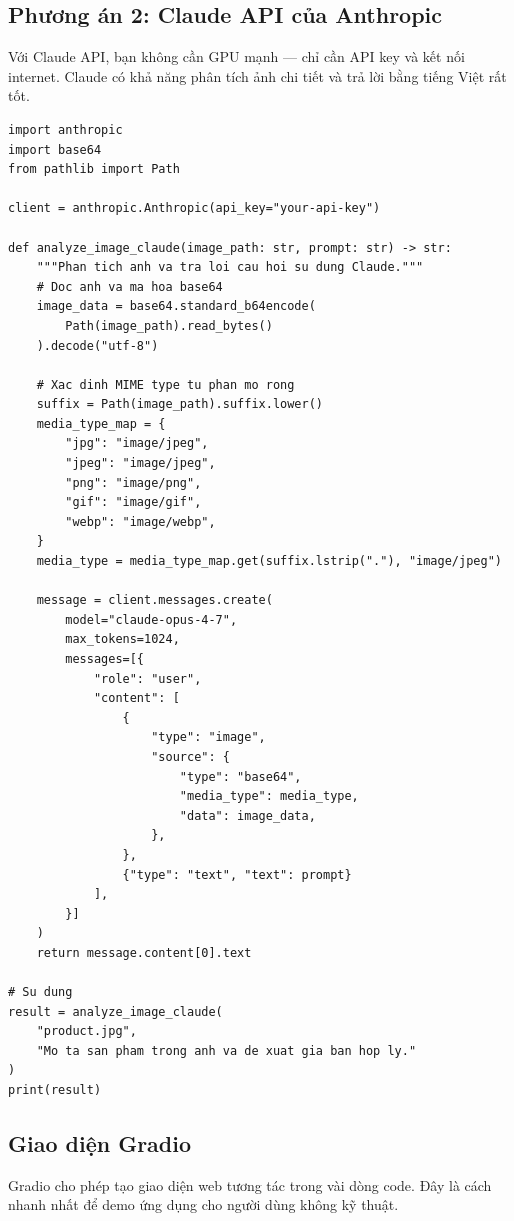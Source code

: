 \subsection{Phương án 2: Claude API của Anthropic}
\label{subsec:vchat_claude}

Với Claude API, bạn không cần GPU mạnh --- chỉ cần API key và kết nối internet. Claude có khả năng phân tích ảnh chi tiết và trả lời bằng tiếng Việt rất tốt.

\begin{verbatim}
import anthropic
import base64
from pathlib import Path

client = anthropic.Anthropic(api_key="your-api-key")

def analyze_image_claude(image_path: str, prompt: str) -> str:
    """Phan tich anh va tra loi cau hoi su dung Claude."""
    # Doc anh va ma hoa base64
    image_data = base64.standard_b64encode(
        Path(image_path).read_bytes()
    ).decode("utf-8")

    # Xac dinh MIME type tu phan mo rong
    suffix = Path(image_path).suffix.lower()
    media_type_map = {
        "jpg": "image/jpeg",
        "jpeg": "image/jpeg",
        "png": "image/png",
        "gif": "image/gif",
        "webp": "image/webp",
    }
    media_type = media_type_map.get(suffix.lstrip("."), "image/jpeg")

    message = client.messages.create(
        model="claude-opus-4-7",
        max_tokens=1024,
        messages=[{
            "role": "user",
            "content": [
                {
                    "type": "image",
                    "source": {
                        "type": "base64",
                        "media_type": media_type,
                        "data": image_data,
                    },
                },
                {"type": "text", "text": prompt}
            ],
        }]
    )
    return message.content[0].text

# Su dung
result = analyze_image_claude(
    "product.jpg",
    "Mo ta san pham trong anh va de xuat gia ban hop ly."
)
print(result)
\end{verbatim}

\subsection{Giao diện Gradio}
\label{subsec:vchat_gradio}

Gradio cho phép tạo giao diện web tương tác trong vài dòng code. Đây là cách nhanh nhất để demo ứng dụng cho người dùng không kỹ thuật.

